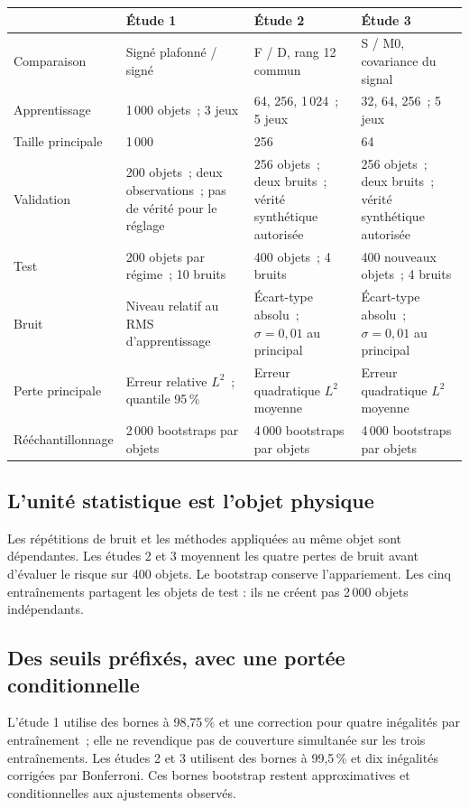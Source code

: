 \documentclass[11pt,a4paper]{article}
\begin{document}
{\small
\begin{tabularx}{\textwidth}{@{}p{}YYY@{}}
\toprule
 & \textbf{Étude 1} & \textbf{Étude 2} & \textbf{Étude 3}\\
\midrule
Comparaison & Signé plafonné / signé & F / D, rang 12 commun & S / M0, covariance du signal\\
\addlinespace
Apprentissage & 1\,000 objets~; 3 jeux & 64, 256, 1\,024~; 5 jeux & 32, 64, 256~; 5 jeux\\
\addlinespace
Taille principale & 1\,000 & 256 & 64\\
\addlinespace
Validation & 200 objets~; deux observations~; pas de vérité pour le réglage & 256 objets~; deux bruits~; vérité synthétique autorisée & 256 objets~; deux bruits~; vérité synthétique autorisée\\
\addlinespace
Test & 200 objets par régime~; 10 bruits & 400 objets~; 4 bruits & 400 nouveaux objets~; 4 bruits\\
\addlinespace
Bruit & Niveau relatif au RMS d'apprentissage & Écart-type absolu~; $\sigma=0,01$ au principal & Écart-type absolu~; $\sigma=0,01$ au principal\\
\addlinespace
Perte principale & Erreur relative $L^2$~; quantile 95\,\% & Erreur quadratique $L^2$ moyenne & Erreur quadratique $L^2$ moyenne\\
\addlinespace
Rééchantillonnage & 2\,000 bootstraps par objets & 4\,000 bootstraps par objets & 4\,000 bootstraps par objets\\
\bottomrule
\end{tabularx}}

\subsection*{L'unité statistique est l'objet physique}
Les répétitions de bruit et les méthodes appliquées au même objet sont dépendantes. Les
études 2 et 3 moyennent les quatre pertes de bruit avant d'évaluer le risque sur 400 objets.
Le bootstrap conserve l'appariement. Les cinq entraînements partagent les objets de test :
ils ne créent pas 2\,000 objets indépendants.

\subsection*{Des seuils préfixés, avec une portée conditionnelle}
L'étude 1 utilise des bornes à 98,75\,\% et une correction pour quatre inégalités par
entraînement~; elle ne revendique pas de couverture simultanée sur les trois entraînements.
Les études 2 et 3 utilisent des bornes à 99,5\,\% et dix inégalités corrigées par Bonferroni.
Ces bornes bootstrap restent approximatives et conditionnelles aux ajustements observés.
\end{document}
